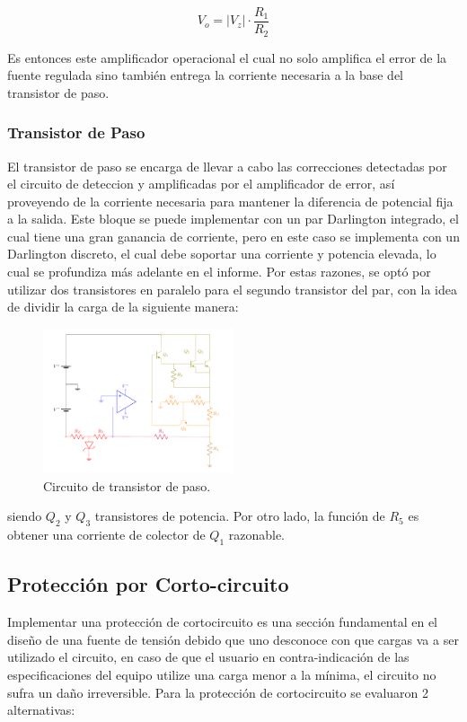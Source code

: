 \begin{equation}
V_o = |V_z| \cdot \frac{R_1}{R_2}
\end{equation}

Es entonces este amplificador operacional el cual no solo amplifica el error de la fuente regulada sino también entrega la corriente necesaria a la base del transistor de paso.

\subsubsection{Transistor de Paso}

\label{sec:transistor-de-paso}
El transistor de paso se encarga de llevar a cabo las correcciones detectadas por el circuito de deteccion y amplificadas por el amplificador de error, así proveyendo de la corriente necesaria para mantener la diferencia de potencial fija a la salida. Este bloque se puede implementar con un par Darlington integrado, el cual tiene una gran ganancia de corriente, pero en este caso se implementa con un Darlington discreto, el cual debe soportar una corriente y potencia elevada, lo cual se profundiza más adelante en el informe. Por estas razones, se optó por utilizar dos transistores en paralelo para el segundo transistor del par, con la idea de dividir la carga de la siguiente manera:

\begin{figure}[H]
\centering
	\includegraphics[width=0.5\textwidth, page=5]{ImagenesEjercicio2/Regulador.pdf}
	\caption{Circuito de transistor de paso.}
	\label{fig:transistorDePaso}
\end{figure}
siendo $Q_2$ y $Q_3$ transistores de potencia. Por otro lado, la función de $R_5$ es obtener una corriente de colector de $Q_1$ razonable.

\subsection{Protección por Corto-circuito}
Implementar una protección de cortocircuito es una sección fundamental en el diseño de una fuente de tensión debido que uno desconoce con que cargas va  a ser utilizado el circuito, en caso de que el usuario en contra-indicación de las especificaciones del equipo utilize una carga menor a la mínima, el circuito no sufra un daño irreversible. 
Para la protección de cortocircuito se evaluaron 2 alternativas:
